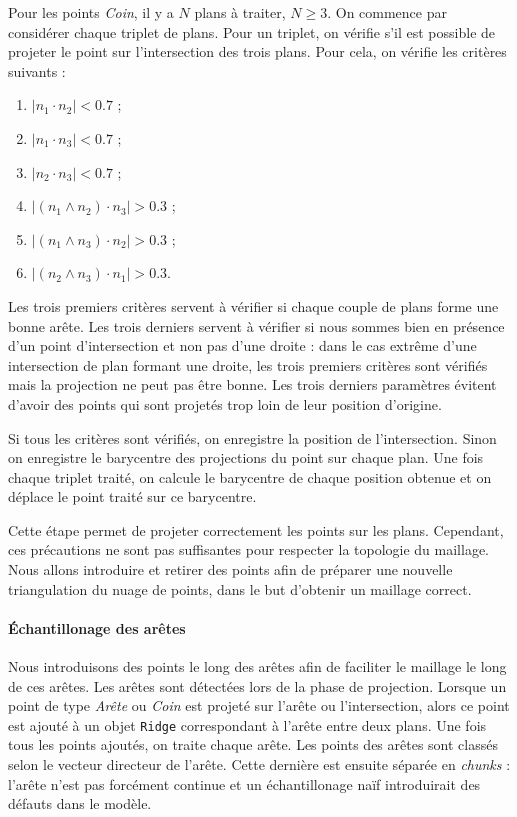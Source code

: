 ﻿\documentclass[12pt, twoside]{article}
\begin{document}
Pour les points \textit{Coin}, il y a $N$ plans à traiter, $N \geq 3$. On commence par considérer chaque triplet de plans. Pour un triplet, on vérifie s'il est possible de projeter le point sur l'intersection des trois plans. Pour cela, on vérifie les critères suivants :
\begin{enumerate}
  \item $\vert n_1 \cdot n_2 \vert < 0.7$ ;
  \item $\vert n_1 \cdot n_3 \vert < 0.7$ ;
  \item $\vert n_2 \cdot n_3 \vert < 0.7$ ;
  \item $\vert (n_1 \wedge n_2) \cdot n_3 \vert > 0.3$ ;
  \item $\vert (n_1 \wedge n_3) \cdot n_2 \vert > 0.3$ ;
  \item $\vert (n_2 \wedge n_3) \cdot n_1 \vert > 0.3$.
\end{enumerate}
Les trois premiers critères servent à vérifier si chaque couple de plans forme une bonne arête. Les trois derniers servent à vérifier si nous sommes bien en présence d'un point d'intersection et non pas d'une droite : dans le cas extrême d'une intersection de plan formant une droite, les trois premiers critères sont vérifiés mais la projection ne peut pas être bonne. Les trois derniers paramètres évitent d'avoir des points qui sont projetés trop loin de leur position d'origine.

Si tous les critères sont vérifiés, on enregistre la position de l'intersection. Sinon on enregistre le barycentre des projections du point sur chaque plan. Une fois chaque triplet traité, on calcule le barycentre de chaque position obtenue et on déplace le point traité sur ce barycentre.

Cette étape permet de projeter correctement les points sur les plans. Cependant, ces précautions ne sont pas suffisantes pour respecter la topologie du maillage. Nous allons introduire et retirer des points afin de préparer une nouvelle triangulation du nuage de points, dans le but d'obtenir un maillage correct.

\paragraph{Échantillonage des arêtes} Nous introduisons des points le long des arêtes afin de faciliter le maillage le long de ces arêtes. Les arêtes sont détectées lors de la phase de projection. Lorsque un point de type \textit{Arête} ou \textit{Coin} est projeté sur l'arête ou l'intersection, alors ce point est ajouté à un objet \texttt{Ridge} correspondant à l'arête entre deux plans. Une fois tous les points ajoutés, on traite chaque arête. Les points des arêtes sont classés selon le vecteur directeur de l'arête. Cette dernière est ensuite séparée en \textit{chunks} : l'arête n'est pas forcément continue et un échantillonage naïf introduirait des défauts dans le modèle.
\end{document}
